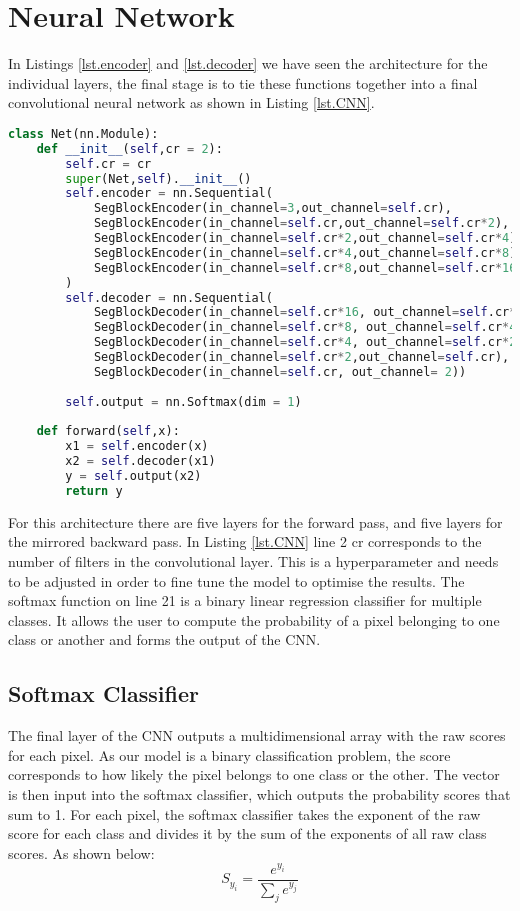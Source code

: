 \section{Neural Network}\label{sub.CNN}
In Listings \ref{lst.encoder} and \ref{lst.decoder} we have seen the architecture for the individual layers, the final stage is to tie these functions together into a final convolutional neural network as shown in Listing \ref{lst.CNN}.
\begin{lstlisting}[language=Python, caption = {A Fully connected Convolutional Neural Network. Shows how the encoder and decoder classes are arranged sequentially in order to transform the data and make a prediction on the pixel class.}, label={lst.CNN},float,floatplacement=htbp]
class Net(nn.Module):
    def __init__(self,cr = 2):
        self.cr = cr
        super(Net,self).__init__()
        self.encoder = nn.Sequential(
            SegBlockEncoder(in_channel=3,out_channel=self.cr),
            SegBlockEncoder(in_channel=self.cr,out_channel=self.cr*2),
            SegBlockEncoder(in_channel=self.cr*2,out_channel=self.cr*4),
            SegBlockEncoder(in_channel=self.cr*4,out_channel=self.cr*8),
            SegBlockEncoder(in_channel=self.cr*8,out_channel=self.cr*16)
        )
        self.decoder = nn.Sequential(
            SegBlockDecoder(in_channel=self.cr*16, out_channel=self.cr*8),
            SegBlockDecoder(in_channel=self.cr*8, out_channel=self.cr*4),
            SegBlockDecoder(in_channel=self.cr*4, out_channel=self.cr*2),
            SegBlockDecoder(in_channel=self.cr*2,out_channel=self.cr),
            SegBlockDecoder(in_channel=self.cr, out_channel= 2))
        
        self.output = nn.Softmax(dim = 1)
        
    def forward(self,x):
        x1 = self.encoder(x)
        x2 = self.decoder(x1)
        y = self.output(x2)
        return y
\end{lstlisting}
For this architecture there are five layers for the forward pass, and five layers for the mirrored backward pass. In Listing \ref{lst.CNN} line 2 cr corresponds to the number of filters in the convolutional layer. This is a hyperparameter and needs to be adjusted in order to fine tune the model to optimise the results. The softmax function on line 21 is a binary linear regression classifier for multiple classes. It allows the user to compute the probability of a pixel belonging to one class or another and forms the output of the CNN.
\subsection{Softmax Classifier}\label{sec.softmax}
The final layer of the CNN outputs a multidimensional array with the raw scores for each pixel. As our model is a binary classification problem, the score corresponds to how likely the pixel belongs to one class or the other. The vector is then input into the softmax classifier, which outputs the probability scores that sum to 1. For each pixel, the softmax classifier takes the exponent of the raw score for each class and divides it by the sum of the exponents of all raw class scores. As shown below:
\[S_{y_i} = \frac{e^{y_i}}{\sum_j e^{y_j}}\]



